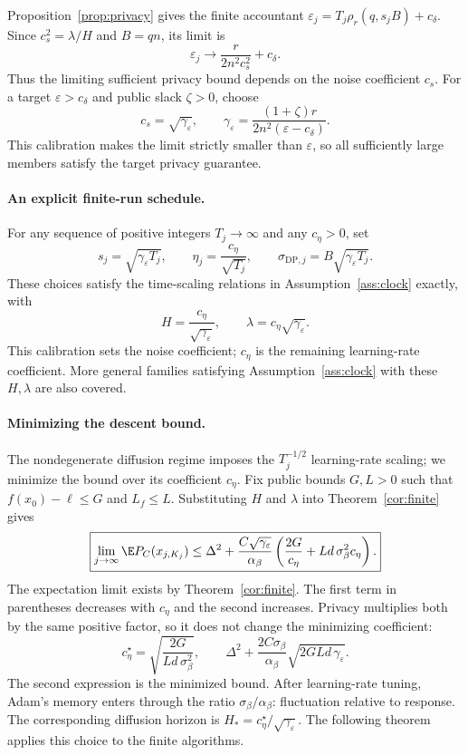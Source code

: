 Proposition~\ref{prop:privacy} gives the finite accountant
$\varepsilon_j=T_j\rho_r(q,s_jB)+c_\delta$. Since
$c_s^2=\lambda/H$ and $B=qn$, its limit is
\[
 \varepsilon_j\longrightarrow\frac{r}{2n^2c_s^2}+c_\delta.
\]
Thus the limiting sufficient privacy bound depends on the noise
coefficient $c_s$. For a target $\varepsilon>c_\delta$ and public slack
$\zeta>0$, choose
\[
 c_s=\sqrt{\gamma_\varepsilon},\qquad
 \gamma_\varepsilon=\frac{(1+\zeta)r}{2n^2(\varepsilon-c_\delta)}.
\]
This calibration makes the limit strictly smaller than $\varepsilon$, so
all sufficiently large members satisfy the target privacy guarantee.

\paragraph{An explicit finite-run schedule.}
For any sequence of positive integers $T_j\to\infty$ and any $c_\eta>0$, set
\begin{equation}\label{eq:explicit-schedule}
 \boxed{
 s_j=\sqrt{\gamma_\varepsilon T_j},\qquad
 \eta_j=\frac{c_\eta}{\sqrt{T_j}},\qquad
 \sigma_{\mathrm{DP},j}=B\sqrt{\gamma_\varepsilon T_j}.}
\end{equation}
These choices satisfy the time-scaling relations in
Assumption~\ref{ass:clock} exactly, with
\[
 H=\frac{c_\eta}{\sqrt{\gamma_\varepsilon}},\qquad
 \lambda=c_\eta\sqrt{\gamma_\varepsilon}.
\]
This calibration sets the noise coefficient; $c_\eta$ is the remaining
learning-rate coefficient. More general families satisfying
Assumption~\ref{ass:clock} with these $H,\lambda$ are also covered.

\paragraph{Minimizing the descent bound.}
The nondegenerate diffusion regime imposes the $T_j^{-1/2}$ learning-rate
scaling; we minimize the bound over its coefficient $c_\eta$.
Fix public bounds $G,L>0$ such that $f(x_0)-\ell\leq G$ and $L_f\leq L$.
Substituting $H$ and $\lambda$ into Theorem~\ref{cor:finite} gives
\begin{equation}\label{eq:coefficient-bound}
 \boxed{\lim_{j\to\infty}\E P_C(x_{j,K_j})
 \leq\Delta^2+\frac{C\sqrt{\gamma_\varepsilon}}{\alpha_\beta}
 \left(\frac{2G}{c_\eta}+Ld\,\sigma_\beta^2 c_\eta\right).}
\end{equation}
The expectation limit exists by Theorem~\ref{cor:finite}.
The first term in parentheses decreases with $c_\eta$ and the second
increases. Privacy multiplies both by the same positive factor, so it
does not change the minimizing coefficient:
\[
 c_\eta^\star=\sqrt{\frac{2G}{Ld\,\sigma_\beta^2}},\qquad
 \Delta^2+\frac{2C\sigma_\beta}{\alpha_\beta}
          \sqrt{2GLd\,\gamma_\varepsilon}.
\]
The second expression is the minimized bound. After learning-rate tuning,
Adam's memory enters through the ratio $\sigma_\beta/\alpha_\beta$:
fluctuation relative to response. The corresponding diffusion
horizon is $H_*=c_\eta^\star/\sqrt{\gamma_\varepsilon}$.
The following theorem applies this choice to the finite algorithms.

